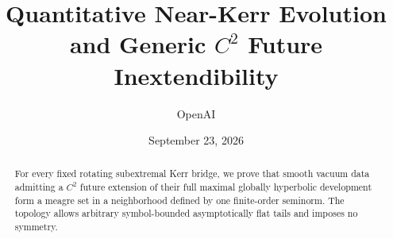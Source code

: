 \documentclass[11pt]{article}
\title{Quantitative Near-Kerr Evolution\\and Generic \(C^2\) Future Inextendibility}
\author{OpenAI}
\date{September 23, 2026}
\theoremstyle{definition}
\theoremstyle{remark}
\numberwithin{equation}{section}
\begin{document}
\maketitle
\begin{abstract}
For every fixed rotating subextremal Kerr bridge, we prove that smooth
vacuum data admitting a \(C^2\) future extension of their full maximal
globally hyperbolic development form a meagre set in a neighborhood
defined by one finite-order seminorm. The topology allows arbitrary
symbol-bounded asymptotically flat tails and imposes no symmetry.
\end{abstract}
\tableofcontents









\appendix






\end{document}
